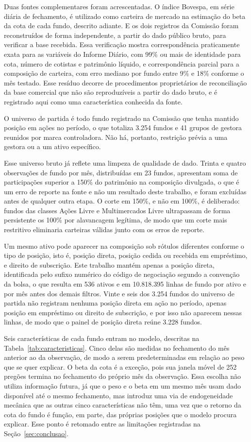 \documentclass[12pt,a4paper]{article}
\begin{document}
Duas fontes complementares foram acrescentadas. O índice Bovespa, em série diária de
fechamento, é utilizado como carteira de mercado na estimação do beta da cota de cada fundo,
descrito adiante. E os dois registros da Comissão foram reconstruídos de forma independente,
a partir do dado público bruto, para verificar a base recebida. Essa verificação mostra
correspondência praticamente exata para as variáveis do Informe Diário, com 99\% ou mais de
identidade para cota, número de cotistas e patrimônio líquido, e correspondência parcial para
a composição de carteira, com erro mediano por fundo entre 9\% e 18\% conforme o mês testado.
Esse resíduo decorre de procedimentos proprietários de reconciliação da base comercial que
não são reproduzíveis a partir do dado bruto, e é registrado aqui como uma característica
conhecida da fonte.

O universo de partida é todo fundo registrado na Comissão que tenha mantido posição em ações
no período, o que totaliza 3.254 fundos e 41 grupos de gestora reunidos por marca
controladora. Não há, portanto, restrição prévia a uma gestora ou a um ativo específico.

Esse universo bruto já reflete uma limpeza de qualidade de dado. Trinta e quatro observações
de fundo por mês, distribuídas em 23 fundos, apresentam soma de participações superior a
150\% do patrimônio na composição divulgada, o que é um erro de reporte na fonte e não um
resultado deste trabalho, e foram excluídas antes de qualquer outra etapa. O corte em 150\%,
e não em 100\%, é deliberado: fundos das classes Ações Livre e Multimercados Livre
ultrapassam de forma persistente os 100\% por alavancagem legítima, de modo que um corte mais
restritivo eliminaria carteiras válidas junto com os erros de reporte.

Um mesmo ativo pode aparecer na composição sob rótulos diferentes conforme o tipo de
posição, isto é, posição direta, posição cedida ou recebida em empréstimo, e direito de
subscrição. Este trabalho mantém apenas a posição direta, identificada pelo sufixo numérico
do código de negociação segundo a convenção da bolsa, o que resulta em 536 ativos e em
10.818.395 linhas de fundo por ativo e por mês antes dos demais filtros. Vinte e seis dos
3.254 fundos do universo de partida não registram nenhuma posição direta em ação no período,
apenas posição em empréstimo ou direito de subscrição, e por isso não aparecem nessas linhas,
de modo que o painel de posição direta reúne 3.228 fundos.

Seis características de cada fundo entram no modelo, descritas na
Tabela~\ref{tab:caracteristicas}. Cinco delas são medidas no fechamento do mês anterior ao da
observação, de modo a serem predeterminadas em relação ao peso que se quer explicar. O beta
da cota é a exceção, pois sua janela móvel de 252 pregões termina no fechamento do próprio
mês da observação. Essa escolha não utiliza informação futura, já que o peso e o beta em um
mesmo mês usam dado disponível até o mesmo fechamento, mas introduz uma via de endogeneidade
mecânica que as outras cinco características não têm, uma vez que o retorno da cota do fundo
é função, em parte, das próprias posições que o modelo procura explicar. Esse ponto é
retomado entre as limitações registradas na Seção~\ref{sec:conclusao}.
\end{document}
